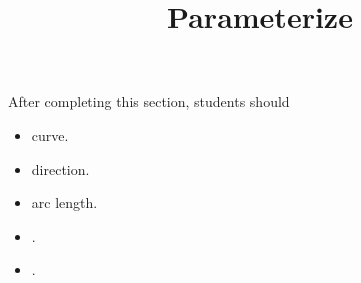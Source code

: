 \documentclass{ximera}
\title{Parameterize}
\begin{document}
\begin{abstract}
\end{abstract}
\maketitle

\begin{sectionOutcomes}
After completing this section, students should 

\begin{itemize}
\item curve.
\item direction.
\item arc length.
\item .
\item .
\end{itemize}
\end{sectionOutcomes}
\end{document}
